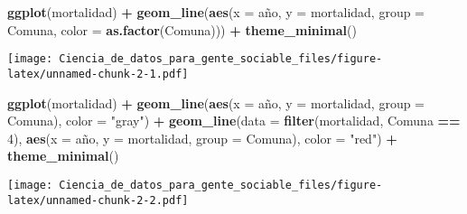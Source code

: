 \documentclass[]{book}
\newenvironment{Shaded}{\begin{snugshade}}{\end{snugshade}}
\newcommand{\KeywordTok}[1]{\textcolor[rgb]{0.13,0.29,0.53}{\textbf{#1}}}
\newcommand{\DataTypeTok}[1]{\textcolor[rgb]{0.13,0.29,0.53}{#1}}
\newcommand{\DecValTok}[1]{\textcolor[rgb]{0.00,0.00,0.81}{#1}}
\newcommand{\StringTok}[1]{\textcolor[rgb]{0.31,0.60,0.02}{#1}}
\newcommand{\OperatorTok}[1]{\textcolor[rgb]{0.81,0.36,0.00}{\textbf{#1}}}
\newcommand{\NormalTok}[1]{#1}
\theoremstyle{definition}
\theoremstyle{definition}
\theoremstyle{definition}
\theoremstyle{remark}
\begin{document}
\begin{Shaded}
\begin{Highlighting}[]
\KeywordTok{ggplot}\NormalTok{(mortalidad) }\OperatorTok{+}\StringTok{ }
\StringTok{    }\KeywordTok{geom_line}\NormalTok{(}\KeywordTok{aes}\NormalTok{(}\DataTypeTok{x =}\NormalTok{ año, }\DataTypeTok{y =}\NormalTok{ mortalidad, }\DataTypeTok{group =}\NormalTok{ Comuna, }\DataTypeTok{color =} \KeywordTok{as.factor}\NormalTok{(Comuna))) }\OperatorTok{+}
\StringTok{    }\KeywordTok{theme_minimal}\NormalTok{()}
\end{Highlighting}
\end{Shaded}

\texttt{[image: Ciencia\_de\_datos\_para\_gente\_sociable\_files/figure-latex/unnamed-chunk-2-1.pdf]}

\begin{Shaded}
\begin{Highlighting}[]
\KeywordTok{ggplot}\NormalTok{(mortalidad) }\OperatorTok{+}\StringTok{ }
\StringTok{    }\KeywordTok{geom_line}\NormalTok{(}\KeywordTok{aes}\NormalTok{(}\DataTypeTok{x =}\NormalTok{ año, }\DataTypeTok{y =}\NormalTok{ mortalidad, }\DataTypeTok{group =}\NormalTok{ Comuna), }\DataTypeTok{color =} \StringTok{"gray"}\NormalTok{) }\OperatorTok{+}
\StringTok{    }\KeywordTok{geom_line}\NormalTok{(}\DataTypeTok{data =} \KeywordTok{filter}\NormalTok{(mortalidad, Comuna }\OperatorTok{==}\StringTok{ }\DecValTok{4}\NormalTok{), }
              \KeywordTok{aes}\NormalTok{(}\DataTypeTok{x =}\NormalTok{ año, }\DataTypeTok{y =}\NormalTok{ mortalidad, }\DataTypeTok{group =}\NormalTok{ Comuna), }\DataTypeTok{color =} \StringTok{"red"}\NormalTok{) }\OperatorTok{+}
\StringTok{    }\KeywordTok{theme_minimal}\NormalTok{()}
\end{Highlighting}
\end{Shaded}

\texttt{[image: Ciencia\_de\_datos\_para\_gente\_sociable\_files/figure-latex/unnamed-chunk-2-2.pdf]}
\end{document}
